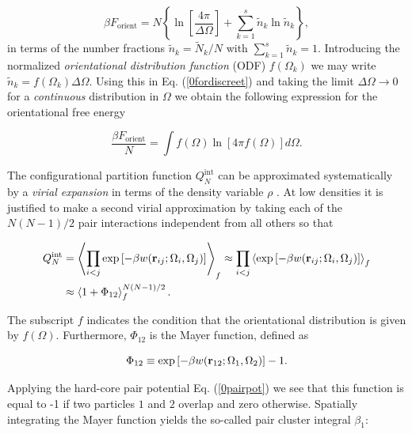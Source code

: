 {\begin{equation}
\beta F_{\text{orient}}=N\left\{\ln \left[\frac{4\pi}{\Delta \Omega}\right] + \sum_{k=1}^{s}\tilde{n}_{k}\ln \tilde{n}_{k} \right\},
\label{0fordiscreet}
\end{equation}
in terms of the number fractions $\tilde{n}_{k}=\tilde{N}_{k}/N$ with $\sum_{k=1}^{s}\tilde{n}_{k}=1$. Introducing the normalized {\em orientational distribution function} (ODF) $f(\Omega_{k})$ we may write $\tilde{n}_{k}=f(\Omega_{k})\Delta\Omega$. Using this in Eq. (\ref{0fordiscreet}) and taking the  limit $\Delta \Omega \rightarrow 0$ for a {\em continuous} distribution in $\Omega$ we obtain the following expression for the orientational free energy

\begin{equation}
\frac{\beta F_{\text{orient}}}{N}=\int f(\Omega)\ln \left[4\pi f(\Omega)\right]d\Omega.
\label{0forient}
\end{equation}

The configurational partition function  $Q_{N}^{\text{int}}$ can be approximated systematically by a {\em virial expansion} in terms of the density variable $\rho$ \cite{hansenmacdonald}. At low densities it is justified to make a second virial approximation   by taking each of the $N(N-1)/2$ pair interactions independent from all others so that

\begin{align}
Q_{N}^{\text{int}}&= \left \langle \prod _{i<j}
\exp\left[-\beta w({\bf r} _{ij}; \Omega_{i}, \Omega_{j})\right]  \right \rangle _{f}
\approx \prod _{i<j}
\left < \exp\left[-\beta w({\bf r} _{ij}; \Omega_{i}, \Omega_{j})\right]  \right>_{f} \nonumber \\
&\approx\left<1+\Phi_{12}\right>_{f} ^{N(N-1)/2}. \label{0secondvir}
\end{align}

The subscript $f$ indicates the condition that the orientational distribution is given by $f(\Omega)$. Furthermore, $\Phi_{12}$ is the Mayer function, defined as

\begin{equation}
\Phi_{12}\equiv \exp\left[-\beta w({\bf r} _{12}; \Omega_{1}, \Omega_{2})\right]-1.
\end{equation}

Applying the hard-core pair potential Eq. (\ref{0pairpot}) we see that this function is equal to -1  if two particles $1$ and $2$ overlap and zero otherwise. Spatially integrating the Mayer function yields the so-called pair cluster integral $\beta _{1}$:

}
